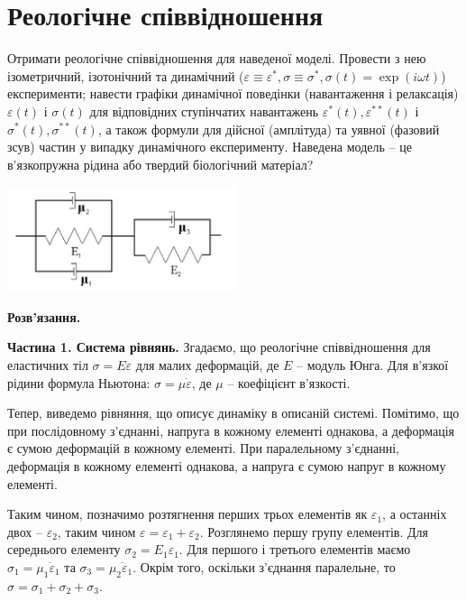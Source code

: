 \documentclass{hw_template}
\begin{document}
\section{Реологічне співвідношення}
\begin{problems}
    Отримати реологічне співвідношення для наведеної моделі. Провести з нею
ізометричний, ізотонічний та динамічний ($\varepsilon \equiv \varepsilon^*, \sigma \equiv
\sigma^*, \sigma(t) = \exp (i\omega t)$) експерименти; навести графіки
динамічної поведінки (навантаження і релаксація) $\varepsilon(t)$ і $\sigma(t)$
для відповідних ступінчатих навантажень $\varepsilon^*(t), \varepsilon^{**}(t)$
і $\sigma^*(t), \sigma^{**}(t)$, а також формули для дійсної (амплітуда) та
уявної (фазовий зсув) частин у випадку динамічного експерименту. Наведена модель
– це в’язкопружна рідина або твердий біологічний матеріал?
\begin{center}
\includegraphics[width=0.5\textwidth]{images/exam/problem.png}
\end{center}
\end{problems}

\textbf{Розв'язання.} 

\textcolor{blue!90!white}{\textbf{Частина 1. Система рівнянь.}} Згадаємо, що
реологічне співвідношення для еластичних тіл $\sigma =
E\varepsilon$ для малих деформацій, де $E$ – модуль Юнга. Для
в'язкої рідини формула Ньютона: $\sigma = \mu \dot{\varepsilon}$, де $\mu$ –
коефіцієнт в'язкості. 

Тепер, виведемо рівняння, що описує динаміку в описаній системі. Помітимо, що
при послідовному з'єднанні, напруга в кожному елементі однакова, а деформація
є сумою деформацій в кожному елементі. При паралельному з'єднанні, деформація
в кожному елементі однакова, а напруга є сумою напруг в кожному елементі. 

Таким чином, позначимо розтягнення перших трьох елементів як $\varepsilon_1$, а
останніх двох – $\varepsilon_2$, таким чином $\varepsilon = \varepsilon_1 +
\varepsilon_2$. Розглянемо першу групу елементів. Для середнього елементу 
$\sigma_2 = E_1\varepsilon_1$. Для першого і третього елементів маємо
$\sigma_1 = \mu_1 \dot{\varepsilon}_1$ та $\sigma_3 = \mu_2 \dot{\varepsilon}_1$.
Окрім того, оскільки з'єднання паралельне, то $\sigma = \sigma_1 + \sigma_2 + \sigma_3$.
\end{document}
